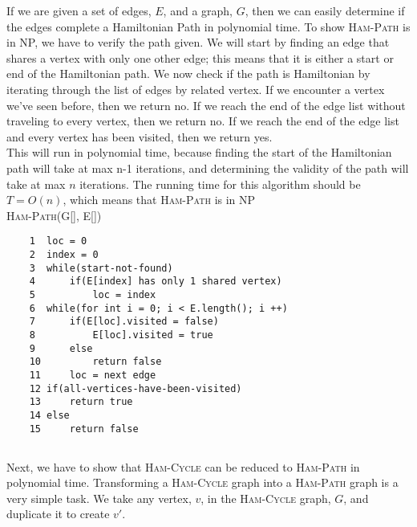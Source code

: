 \documentclass{article}
\begin{document}
If we are given a set of edges, $E$, and a graph, $G$, then we can easily determine if the edges complete a Hamiltonian Path in polynomial time.  To show \textsc{Ham-Path} is in NP, we have to verify the path given.  We will start by finding an edge that shares a vertex with only one other edge; this means that it is either a start or end of the Hamiltonian path.  We now check if the path is Hamiltonian by iterating through the list of edges by related vertex.  If we encounter a vertex we've seen before, then we return no.  If we reach the end of the edge list without traveling to every vertex, then we return no.  If we reach the end of the edge list and every vertex has been visited, then we return yes.\\

This will run in polynomial time, because finding the start of the Hamiltonian path will take at max n-1 iterations, and determining the validity of the path will take at max $n$ iterations.  The running time for this algorithm should be $T = O(n)$, which means that \textsc{Ham-Path} is in NP\\

\textsc{Ham-Path(G[], E[])}

\begin{verbatim}
    1  loc = 0
    2  index = 0
    3  while(start-not-found)
    4      if(E[index] has only 1 shared vertex)
    5          loc = index
    6  while(for int i = 0; i < E.length(); i ++)
    7      if(E[loc].visited = false)
    8          E[loc].visited = true
    9      else
    10         return false
    11     loc = next edge
    12 if(all-vertices-have-been-visited)
    13     return true
    14 else
    15     return false
\end{verbatim}

\subsection{}

Next, we have to show that \textsc{Ham-Cycle} can be reduced to \textsc{Ham-Path} in polynomial time.  Transforming a \textsc{Ham-Cycle} graph into a \textsc{Ham-Path} graph is a very simple task.  We take any vertex, $v$, in the \textsc{Ham-Cycle} graph, $G$, and duplicate it to create $v'$.

\section{}

    \subsection{}
    
    \subsection{}
\end{document}
